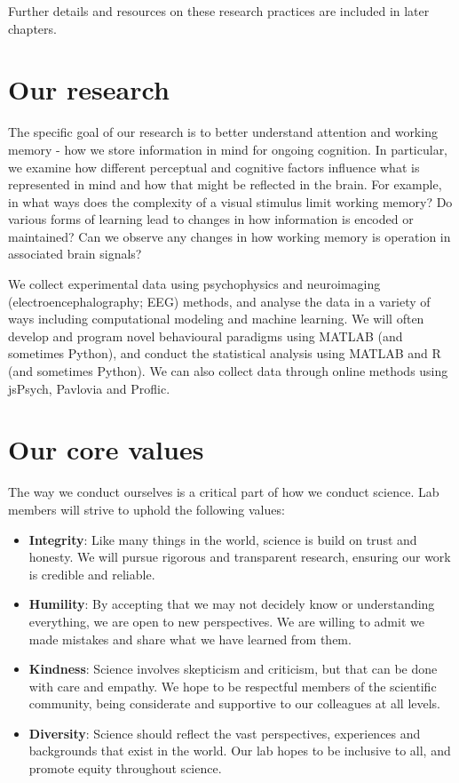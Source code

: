 \documentclass[
]{book}
\begin{document}
Further details and resources on these research practices are included in later chapters.

\hypertarget{our-research}{%
\section{Our research}\label{our-research}}

The specific goal of our research is to better understand attention and working memory - how we store information in mind for ongoing cognition. In particular, we examine how different perceptual and cognitive factors influence what is represented in mind and how that might be reflected in the brain. For example, in what ways does the complexity of a visual stimulus limit working memory? Do various forms of learning lead to changes in how information is encoded or maintained? Can we observe any changes in how working memory is operation in associated brain signals?

We collect experimental data using psychophysics and neuroimaging (electroencephalography; EEG) methods, and analyse the data in a variety of ways including computational modeling and machine learning. We will often develop and program novel behavioural paradigms using MATLAB (and sometimes Python), and conduct the statistical analysis using MATLAB and R (and sometimes Python). We can also collect data through online methods using jsPsych, Pavlovia and Proflic.

\hypertarget{lab-values}{%
\section{Our core values}\label{lab-values}}

The way we conduct ourselves is a critical part of how we conduct science. Lab members will strive to uphold the following values:

\begin{itemize}
\item
  \textbf{Integrity}: Like many things in the world, science is build on trust and honesty. We will pursue rigorous and transparent research, ensuring our work is credible and reliable.
\item
  \textbf{Humility}: By accepting that we may not decidely know or understanding everything, we are open to new perspectives. We are willing to admit we made mistakes and share what we have learned from them.
\item
  \textbf{Kindness}: Science involves skepticism and criticism, but that can be done with care and empathy. We hope to be respectful members of the scientific community, being considerate and supportive to our colleagues at all levels.
\item
  \textbf{Diversity}: Science should reflect the vast perspectives, experiences and backgrounds that exist in the world. Our lab hopes to be inclusive to all, and promote equity throughout science.
\end{itemize}
\end{document}
